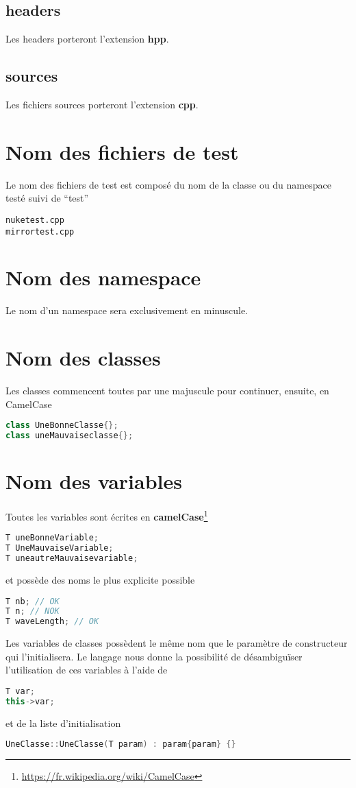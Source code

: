 \documentclass[a4paper,11pt]{report}
\begin{document}
\subsection{headers}
Les headers porteront l'extension \textbf{hpp}.
\subsection{sources}
Les fichiers sources porteront l'extension \textbf{cpp}.
\section{Nom des fichiers de test}
Le nom des fichiers de test est composé du nom de la classe ou du namespace
testé suivi de ``test''
\begin{lstlisting}[frame=single]
nuketest.cpp
mirrortest.cpp
\end{lstlisting}
\section{Nom des namespace}
Le nom d'un namespace sera exclusivement en minuscule.
\section{Nom des classes}
Les classes commencent toutes par une majuscule pour continuer, ensuite, en
CamelCase
\begin{lstlisting}[frame=single,language=C++]
class UneBonneClasse{};
class uneMauvaiseclasse{};
\end{lstlisting}
\section{Nom des variables}
Toutes les variables sont écrites en
\textbf{camelCase}\footnote{\url{https://fr.wikipedia.org/wiki/CamelCase}}
\begin{lstlisting}[frame=single,language=C++]
T uneBonneVariable;
T UneMauvaiseVariable;
T uneautreMauvaisevariable;
\end{lstlisting}
et possède des noms le plus explicite possible
\begin{lstlisting}[frame=single,language=C++]
T nb; // OK
T n; // NOK
T waveLength; // OK
\end{lstlisting}
Les variables de classes possèdent le même nom que le paramètre de constructeur
qui l'initialisera. Le langage nous donne la possibilité de désambiguïser
l'utilisation de ces variables à l'aide de 
\begin{lstlisting}[frame=single,language=C++]
T var;
this->var;
\end{lstlisting}
et de la liste d'initialisation
\begin{lstlisting}[frame=single,language=C++]
UneClasse::UneClasse(T param) : param{param} {}
\end{lstlisting}
\end{document}
